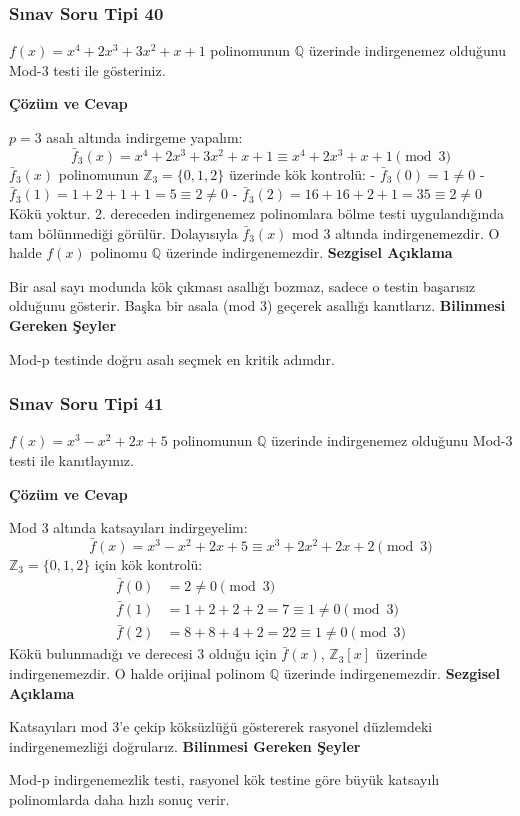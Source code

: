 \documentclass[11pt, a4paper]{article}
\newenvironment{cozum}{
    \vspace{0.5cm}
    \noindent\textcolor{green!60!black}{\faCheckCircle\enspace \textbf{\Large Çözüm ve Cevap}}\par\vspace{0.2cm}
}{}
\newenvironment{sezgisel}{
    \vspace{0.5cm}
    \noindent\textcolor{orange!80!black}{\faLightbulb\enspace \textbf{\Large Sezgisel Açıklama}}\par\vspace{0.2cm}
    \itshape
}{}
\newenvironment{bilgi}{
    \vspace{0.5cm}
    \noindent\textcolor{red!70!black}{\faExclamationTriangle\enspace \textbf{\Large Bilinmesi Gereken Şeyler}}\par\vspace{0.2cm}
}{}
\begin{document}
\subsubsection{Sınav Soru Tipi 40}
\begin{sinavbox}
$f(x) = x^4+2x^3+3x^2+x+1$ polinomunun $\mathbb{Q}$ üzerinde indirgenemez olduğunu Mod-3 testi ile gösteriniz.
\end{sinavbox}
\begin{cozum}
$p=3$ asalı altında indirgeme yapalım:
\[ \bar{f}_3(x) = x^4 + 2x^3 + 3x^2 + x + 1 \equiv x^4 + 2x^3 + x + 1 \pmod 3 \]
$\bar{f}_3(x)$ polinomunun $\mathbb{Z}_3 = \{0, 1, 2\}$ üzerinde kök kontrolü:
- $\bar{f}_3(0) = 1 \neq 0$
- $\bar{f}_3(1) = 1+2+1+1 = 5 \equiv 2 \neq 0$
- $\bar{f}_3(2) = 16+16+2+1 = 35 \equiv 2 \neq 0$
Kökü yoktur. 2. dereceden indirgenemez polinomlara bölme testi uygulandığında tam bölünmediği görülür.
Dolayısıyla $\bar{f}_3(x)$ mod 3 altında indirgenemezdir. O halde $f(x)$ polinomu $\mathbb{Q}$ üzerinde indirgenemezdir.
\end{cozum}
\begin{sezgisel}
Bir asal sayı modunda kök çıkması asallığı bozmaz, sadece o testin başarısız olduğunu gösterir. Başka bir asala (mod 3) geçerek asallığı kanıtlarız.
\end{sezgisel}
\begin{bilgi}
Mod-p testinde doğru asalı seçmek en kritik adımdır.
\end{bilgi}

\newpage
\subsubsection{Sınav Soru Tipi 41}
\begin{sinavbox}
$f(x) = x^3-x^2+2x+5$ polinomunun $\mathbb{Q}$ üzerinde indirgenemez olduğunu Mod-3 testi ile kanıtlayınız.
\end{sinavbox}
\begin{cozum}
Mod 3 altında katsayıları indirgeyelim:
\[ \bar{f}(x) = x^3 - x^2 + 2x + 5 \equiv x^3 + 2x^2 + 2x + 2 \pmod 3 \]
$\mathbb{Z}_3 = \{0, 1, 2\}$ için kök kontrolü:
\begin{align*}
\bar{f}(0) &= 2 \neq 0 \pmod 3 \\
\bar{f}(1) &= 1 + 2 + 2 + 2 = 7 \equiv 1 \neq 0 \pmod 3 \\
\bar{f}(2) &= 8 + 8 + 4 + 2 = 22 \equiv 1 \neq 0 \pmod 3
\end{align*}
Kökü bulunmadığı ve derecesi 3 olduğu için $\bar{f}(x)$, $\mathbb{Z}_3[x]$ üzerinde indirgenemezdir. O halde orijinal polinom $\mathbb{Q}$ üzerinde indirgenemezdir.
\end{cozum}
\begin{sezgisel}
Katsayıları mod 3'e çekip köksüzlüğü göstererek rasyonel düzlemdeki indirgenemezliği doğrularız.
\end{sezgisel}
\begin{bilgi}
Mod-p indirgenemezlik testi, rasyonel kök testine göre büyük katsayılı polinomlarda daha hızlı sonuç verir.
\end{bilgi}
\end{document}
